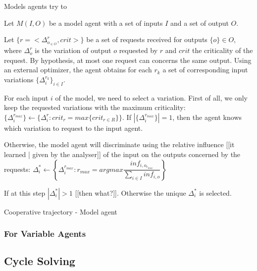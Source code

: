 Models agents try to 

Let $M(I,O)$ be a model agent with a set of inputs $I$ and a set of output $O$.

Let $\{r = <\Delta_{o_{\in O}}^{r}, crit>\}$ be a set of  requests received for outputs $\{o\} \in O$, where $\Delta_{o}^{r}$ is the variation of output $o$ requested by $r$ and $crit$ the criticality of the request. By hypothesis, at most one request can concerns the same output.
Using an external optimizer, the agent obtains for each $r_k$ a set of corresponding input variations $\{\Delta_i^{r_k}\}_{i \in I}$.

For each input $i$ of the model, we need to select a variation.
First of all, we only keep the requested variations with the maximum criticality:  $\{\Delta_i^{r_{max}}\} \leftarrow \{\Delta_i^r : crit_r = max \{crit_{r \in R}\}\}$.
If $|\{\Delta_i^{r_{max}}\}| =  1$, then the agent knows which variation to request to the input agent.

Otherwise, the model agent will discriminate using the relative influence [[it learned | given by the analyser]] of the input on the outputs concerned by the requests: 
$\Delta_i^* \leftarrow \left\{ \Delta_i^{r_{max}} : r_{max} = argmax \dfrac{inf_{i,o_{r_{max}}}}{\sum \limits_{i \in I} inf_{i,o}} \right\}$

If at this step $|\Delta_i^*| >1$ [[then what?]]. Otherwise the unique $\Delta_i^*$ is selected.

\begin{algorithm}
\caption{Cooperative trajectory - Model agent}
\label{algo_cooperative_trajectory_model}


\end{algorithm}

\subsubsection{For Variable Agents}

\subsection{Cycle Solving}

